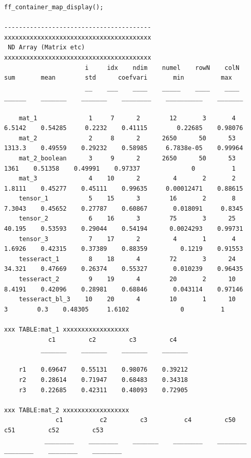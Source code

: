 \documentclass[
]{book}
\begin{document}
\begin{verbatim}
ff_container_map_display();

----------------------------------------
xxxxxxxxxxxxxxxxxxxxxxxxxxxxxxxxxxxxxxxx
 ND Array (Matrix etc)
xxxxxxxxxxxxxxxxxxxxxxxxxxxxxxxxxxxxxxxx
                      i     idx    ndim    numel    rowN    colN     sum       mean        std      coefvari       min          max  
                      __    ___    ____    _____    ____    ____    ______    _______    _______    ________    __________    _______

    mat_1              1     7      2        12       3       4     6.5142    0.54285     0.2232    0.41115        0.22685    0.98076
    mat_2              2     8      2      2650      50      53     1313.3    0.49559    0.29232    0.58985     6.7838e-05    0.99964
    mat_2_boolean      3     9      2      2650      50      53       1361    0.51358    0.49991    0.97337              0          1
    mat_3              4    10      2         4       2       2     1.8111    0.45277    0.45111    0.99635     0.00012471    0.88615
    tensor_1           5    15      3        16       2       8     7.3043    0.45652    0.27787    0.60867       0.018091     0.8345
    tensor_2           6    16      3        75       3      25     40.195    0.53593    0.29044    0.54194      0.0024293    0.99731
    tensor_3           7    17      2         4       1       4     1.6926    0.42315    0.37389    0.88359         0.1219    0.91553
    tesseract_1        8    18      4        72       3      24     34.321    0.47669    0.26374    0.55327       0.010239    0.96435
    tesseract_2        9    19      4        20       2      10     8.4191    0.42096    0.28981    0.68846       0.043114    0.97146
    tesseract_bl_3    10    20      4        10       1      10          3        0.3    0.48305     1.6102              0          1

xxx TABLE:mat_1 xxxxxxxxxxxxxxxxxx
            c1         c2         c3         c4   
          _______    _______    _______    _______

    r1    0.69647    0.55131    0.98076    0.39212
    r2    0.28614    0.71947    0.68483    0.34318
    r3    0.22685    0.42311    0.48093    0.72905

xxx TABLE:mat_2 xxxxxxxxxxxxxxxxxx
              c1          c2         c3          c4         c50         c51         c52         c53   
           ________    ________    _______    ________    ________    ________    ________    ________


\end{verbatim}
\end{document}
